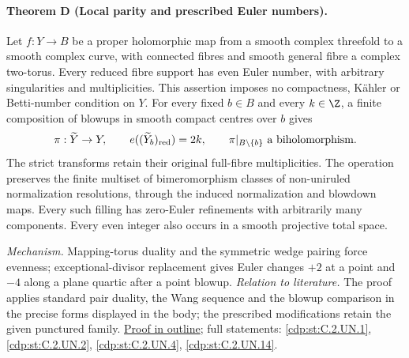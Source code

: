\hypertarget{main-II-D}{}
\paragraph{Theorem D (Local parity and prescribed Euler numbers).}
\label{series:II:D}
Let $f:Y\to B$ be a proper holomorphic map from a smooth complex
threefold to a smooth complex curve, with connected fibres and
smooth general fibre a complex two-torus. Every reduced fibre
support has even Euler number, with arbitrary singularities and
multiplicities. This assertion imposes no compactness, K\"ahler
or Betti-number condition on $Y$.
For every fixed $b\in B$ and every $k\in\Z$, a finite composition
of blowups in smooth compact centres over $b$ gives
\[
 \pi:\widetilde Y\to Y,
 \qquad e((\widetilde Y_b)_{\rm red})=2k,
 \qquad \pi|_{B\setminus\{b\}}\text{ a biholomorphism}.
\]
The strict transforms retain their original full-fibre
multiplicities. The operation preserves the finite multiset of
bimeromorphism classes of non-uniruled normalization resolutions,
through the induced normalization and blowdown maps. Every such
filling has zero-Euler refinements with arbitrarily many components.
Every even integer also occurs in a smooth projective total space.

\textit{Mechanism.} Mapping-torus duality and the symmetric wedge
pairing force evenness; exceptional-divisor replacement gives Euler
changes $+2$ at a point and $-4$ along a plane quartic after a point
blowup.
\textit{Relation to literature.} The proof applies standard pair
duality, the Wang sequence and the blowup comparison in the precise
forms displayed in the body; the prescribed modifications retain
the given punctured family.
\hyperlink{outline-II-D}{Proof in outline}; full statements:
\ref{cdp:st:C.2.UN.1}, \ref{cdp:st:C.2.UN.2},
\ref{cdp:st:C.2.UN.4}, \ref{cdp:st:C.2.UN.14}.

\hypertarget{main-II-E}{}

